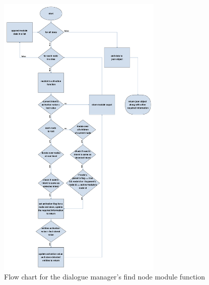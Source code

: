 \begin{figure}[!h]
    \centering
    \includegraphics[width=0.7\textwidth]{img/Dialogue_manager.pdf}
    \caption{Flow chart for the dialogue manager's find node module function}
    \label{fig:flowDialogueMan}
\end{figure}

